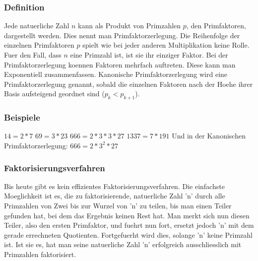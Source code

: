 \subsubsection{Definition}
Jede natuerliche Zahl $n$ kann als Produkt von Primzahlen $p$, den Primfaktoren, dargestellt werden. Dies nennt man Primfaktorzerlegung. Die Reihenfolge der einzelnen Primfaktoren $p$ spielt wie bei jeder anderen Multiplikation keine Rolle. Fuer den Fall, dass $n$ eine Primzahl ist, ist sie ihr einziger Faktor. Bei der Primfaktorzerlegung koennen Faktoren mehrfach auftreten. Diese kann man Exponentiell zusammenfassen. Kanonische Primfaktorzerlegung wird eine Primfaktorzerlegung genannt, sobald die einzelnen Faktoren nach der Hoehe ihrer Basis aufsteigend geordnet sind ($p_k < p_{k+1}$).
\subsubsection{Beispiele}
$14 = 2 * 7$\newline
$69 = 3 * 23$\newline
$666 = 2 * 3 * 3 * 27$\newline
$1337 = 7 * 191$\newline\newline
Und in der Kanonischen Primfaktorzerlegung:\newline\newline
$666 = 2 * 3^2 * 27$
\subsubsection{Faktorisierungsverfahren}
Bis heute gibt es kein effizientes Faktorisierungsverfahren. Die einfachste Moeglichkeit ist es, die zu faktorisierende, natuerliche Zahl 'n' durch alle Primzahlen von Zwei bis zur Wurzel von 'n' zu teilen, bis man einen Teiler gefunden hat, bei dem das Ergebnis keinen Rest hat. Man merkt sich nun diesen Teiler, also den ersten Primfaktor, und fuehrt nun fort, ersetzt jedoch 'n' mit dem gerade errechneten Quotienten. Fortgefuerht wird dies, solange 'n' keine Primzahl ist. Ist sie es, hat man seine natuerliche Zahl 'n' erfolgreich ausschliesslich mit Primzahlen faktorisiert.
